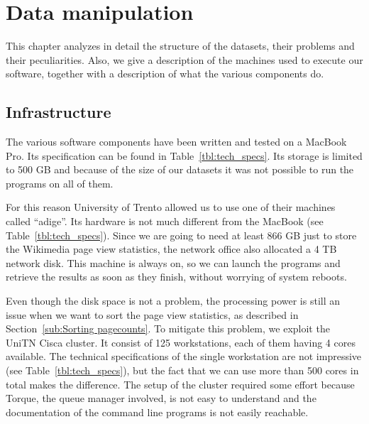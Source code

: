 \cleardoublepage{}
\chapter{Data manipulation}
\label{cha:system_architecture}
This chapter analyzes in detail the structure of the datasets, their problems and their peculiarities.
Also, we give a description of the machines used to execute our software, together with a description of what the various components do.

\section{Infrastructure}
\label{sec:infrastructure}
The various software components have been written and tested on a MacBook Pro.
Its specification can be found in Table~\ref{tbl:tech_specs}.
Its storage is limited to 500 GB and because of the size of our datasets it was not possible to run the programs on all of them.

For this reason University of Trento allowed us to use one of their machines called ``adige''.
Its hardware is not much different from the MacBook (see Table~\ref{tbl:tech_specs}).
Since we are going to need at least 866 GB just to store the Wikimedia page view statistics, the network office also allocated a 4 TB network disk.
This machine is always on, so we can launch the programs and retrieve the results as soon as they finish, without worrying of system reboots.

Even though the disk space is not a problem, the processing power is still an issue when we want to sort the page view statistics, as described in Section~\ref{sub:Sorting pagecounts}.
To mitigate this problem, we exploit the UniTN Cisca cluster.
It consist of 125 workstations, each of them having 4 cores available.
The technical specifications of the single workstation are not impressive (see Table~\ref{tbl:tech_specs}), but the fact that we can use more than 500 cores in total makes the difference.
The setup of the cluster required some effort because Torque, the queue manager involved, is not easy to understand and the documentation of the command line programs is not easily reachable.

